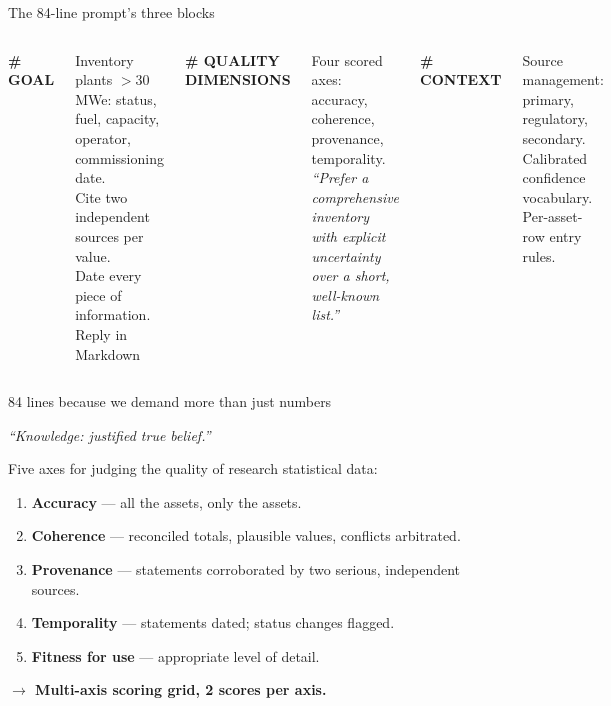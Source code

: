 \documentclass[aspectratio=169]{beamer}
\begin{document}
\begin{frame}{The 84-line prompt's three blocks}
\begin{columns}[T]
\textbf{\# GOAL}

\smallskip
{\small Inventory plants $>30$\,MWe: status, fuel, capacity, operator, commissioning date.\\[4pt]
Cite two independent sources per value.\\[4pt]
Date every piece of information.\\[4pt]
Reply in Markdown}

\textbf{\# QUALITY DIMENSIONS}

\smallskip
{\small Four scored axes: accuracy, coherence, provenance, temporality.\\[4pt]
\textit{``Prefer a comprehensive inventory with explicit uncertainty over a short, well-known list.''}}

\textbf{\# CONTEXT}

\smallskip
{\small Source management: primary, regulatory, secondary.\\[4pt]
Calibrated confidence vocabulary.\\[4pt]
Per-asset-row entry rules.}
\end{columns}

\end{frame}

\begin{frame}{84 lines because we demand more than just numbers}
\begin{center}
{\small\textit{``Knowledge: justified true belief.''}}
\end{center}

\medskip
\small
Five axes for judging the quality of research statistical data:
\begin{enumerate}\setlength\itemsep{4pt}
  \item \textbf{Accuracy} --- all the assets, only the assets.
  \item \textbf{Coherence} --- reconciled totals, plausible values, conflicts arbitrated.
  \item \textbf{Provenance} --- statements corroborated by two serious, independent sources.
  \item \textbf{Temporality} --- statements dated; status changes flagged.
      \item \textbf{Fitness for use} --- appropriate level of detail.
\end{enumerate}

\bigskip
\begin{center}
\small\textbf{$\to$ Multi-axis scoring grid, 2 scores per axis.}
\end{center}
\end{frame}
\end{document}
